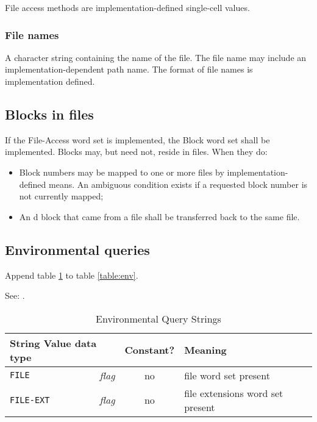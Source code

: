 File access methods are implementation-defined single-cell
values.

\subsubsection{File names} %
\label{file:names}

A character string containing the name of the file. The file name
may include an implementation-dependent path name. The format of
file names is implementation defined.

\subsection{Blocks in files} %
\label{file:blocks}

If the File-Access word set is implemented, the Block word set
shall be implemented. Blocks may, but need not, reside in files.
When they do:
\begin{itemize}
\item Block numbers may be mapped to one or more files by
	implementation-defined means. An ambiguous condition exists
	if a requested block number is not currently mapped;
\item An d block that came from a file shall
	be transferred back to the same file.
\end{itemize}


\subsection{Environmental queries} %

Append table \ref{file:env} to table \ref{table:env}.

See: .

\begin{table}[ht]
  \begin{center}
	\caption{Environmental Query Strings}
	\label{file:env}
	\begin{tabular}{p{9em}rcp{}}
		\hline\hline
		\multicolumn{2}{l}{String \hfill Value data type} & Constant? & Meaning \\
		\hline
		\texttt{FILE}		& \emph{flag}		& no	&
			file word set present \\
		\texttt{FILE-EXT}	& \emph{flag}		& no	&
			file extensions word set present \\
		\hline\hline
	\end{tabular}
  \end{center}
\end{table}

